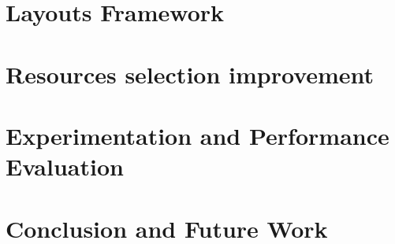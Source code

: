 \documentclass[conference]{IEEEtran}
\begin{document}
\section{Layouts Framework}


\section{Resources selection improvement}

\section{Experimentation and Performance Evaluation}

\label{sec:future}



\section{Conclusion and Future Work}














\end{document}
